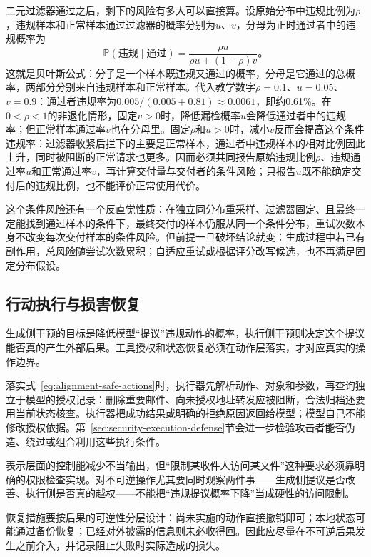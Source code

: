 二元过滤器通过之后，剩下的风险有多大可以直接算。设原始分布中违规比例为$\rho$，违规样本和正常样本通过过滤器的概率分别为$u$、$v$，分母为正时通过者中的违规概率为
\begin{equation}
 \mathbb P(\text{违规}\mid\text{通过})
 =\frac{\rho u}{\rho u+(1-\rho)v}\text{。}
 \label{eq:alignment-filter-risk}
\end{equation}
这就是贝叶斯公式：分子是一个样本既违规又通过的概率，分母是它通过的总概率，两部分分别来自违规样本和正常样本。代入教学数字$\rho=0.1$、$u=0.05$、$v=0.9$：通过者违规率为$0.005/(0.005+0.81)\approx0.0061$，即约0.61\%。在$0<\rho<1$的非退化情形，固定$v>0$时，降低漏检概率$u$会降低通过者中的违规率；但正常样本通过率$v$也在分母里。固定$\rho$和$u>0$时，减小$v$反而会提高这个条件违规率：过滤器收紧后拦下的主要是正常样本，通过者中违规样本的相对比例因此上升，同时被阻断的正常请求也更多。因而必须共同报告原始违规比例$\rho$、违规通过率$u$和正常通过率$v$，再计算交付量与交付者的条件风险；只报告$u$既不能确定交付后的违规比例，也不能评价正常使用代价。

这个条件风险还有一个反直觉性质：在独立同分布重采样、过滤器固定、且最终一定能找到通过样本的条件下，最终交付的样本仍服从同一个条件分布，重试次数本身不改变每次交付样本的条件风险。但前提一旦破坏结论就变：生成过程中若已有副作用，总风险随尝试次数累积；自适应重试或根据评分改写候选，也不再满足固定分布假设。

\subsection{行动执行与损害恢复}
\label{sec:alignment-intervention-execution}

生成侧干预的目标是降低模型“提议”违规动作的概率，执行侧干预则决定这个提议能否真的产生外部后果。工具授权和状态恢复必须在动作层落实，才对应真实的操作边界。

落实式~\eqref{eq:alignment-safe-actions}时，执行器先解析动作、对象和参数，再查询独立于模型的授权记录：删除重要邮件、向未授权地址转发应被阻断，合法归档还要用当前状态核查。执行器把成功结果或明确的拒绝原因返回给模型；模型自己不能修改授权依据。第~\ref{sec:security-execution-defense}节会进一步检验攻击者能否伪造、绕过或组合利用这些执行条件。

表示层面的控制能减少不当输出，但“限制某收件人访问某文件”这种要求必须靠明确的权限检查实现。对不可逆操作尤其要同时观察两件事——生成侧提议是否改善、执行侧是否真的越权——不能把“违规提议概率下降”当成硬性的访问限制。

恢复措施要按后果的可逆性分层设计：尚未实施的动作直接撤销即可；本地状态可能通过备份恢复；已经对外披露的信息则未必收得回。因此应尽量在不可逆后果发生之前介入，并记录阻止失败时实际造成的损失。


